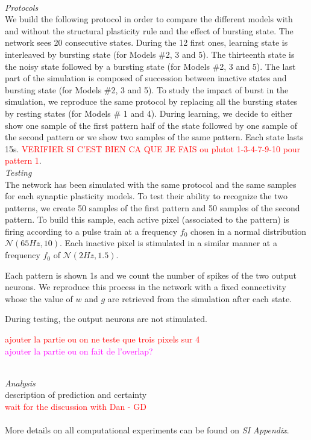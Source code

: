 ~\\
\textit{Protocols}\\
We build the following protocol in order to compare the different models with and without the structural plasticity rule and the effect of bursting state. The network sees 20 consecutive states. 
During the 12 first ones, learning state is interleaved by bursting state (for Models $\#$2, 3 and 5). The thirteenth state is the noisy state followed by a bursting state (for Models $\#$2, 3 and 5). The last part of the simulation is composed of succession between inactive states and bursting state (for Models $\#$2, 3 and 5). To study the impact of burst in the simulation, we reproduce the same protocol by replacing all the bursting states by resting states  (for Models $\#$ 1 and 4). 
During learning, we decide to either show one sample of the first pattern half of the state followed by one sample of the second pattern or we show two samples of the same pattern. Each state lasts 15s. \textcolor{red}{VERIFIER SI C'EST BIEN CA QUE JE FAIS ou plutot 1-3-4-7-9-10 pour pattern 1}. 
~\\
\textit{Testing}\\
The network has been simulated with the same protocol and the same samples for each synaptic plasticity models. To test their ability to recognize the two patterns, we create 50 samples of the first pattern and 50 samples of the second pattern. To build this sample, each active pixel (associated to the pattern) is firing according to a pulse train at a frequency $f_0$ chosen in a normal distribution $\mathcal{N}(65Hz,10)$. Each inactive pixel is stimulated in a similar manner at a frequency $f_0$ of $\mathcal{N}(2Hz,1.5)$.

Each pattern is shown 1s and we count the number of spikes of the two output neurons. We reproduce this process in the network with a fixed connectivity whose the value of $w$ and $g$ are retrieved from the simulation after each state. 

During testing, the output neurons are not stimulated. 

\textcolor{red}{ajouter la partie ou on ne teste que trois pixels sur 4}\\


\textcolor{magenta}{ajouter la partie ou on fait de l'overlap? }



~\\
\textit{Analysis}\\
description of prediction and certainty\\
\textcolor{red}{wait for the discussion with Dan - GD}\\
~\\
More details on all computational experiments can be found on \textit{SI Appendix}.


